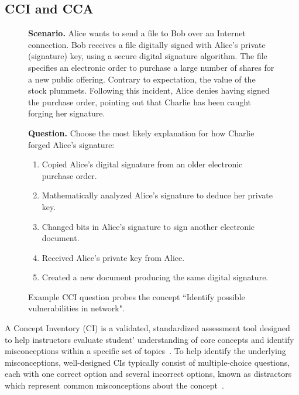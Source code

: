 \documentclass{uofithesis}
\begin{document}
\subsection{CCI and CCA}
\begin{figure} [H]
	\begin{mdframed}

		\small
		\raggedright
    \textbf{Scenario.}
      Alice wants to send a file to Bob over an Internet connection.
      Bob receives a file digitally signed with Alice’s private (signature) key, using a secure digital signature algorithm. The file specifies an electronic order to purchase a large number of shares for a new public offering. 
      Contrary to expectation, the value of the stock plummets. Following this incident, Alice denies having signed the purchase order, pointing out that Charlie has been caught forging her signature.

    \textbf{Question.} Choose the most likely explanation for how Charlie forged Alice’s signature:

    \begin{enumerate}
			\def\labelenumi{\Alph{enumi}.}
			\item
			Copied Alice’s digital signature from an older electronic purchase order.
			\item
			Mathematically analyzed Alice’s signature to deduce her private key.
			\item
			Changed bits in Alice’s signature to sign another electronic document.
			\item
			Received Alice’s private key from Alice.
			\item
			Created a new document producing the same digital signature.
	\end{enumerate}

	\end{mdframed}
	\caption{Example CCI question probes the concept ``Identify possible vulnerabilities in network".}

	\label{fig:example-question-intro}
\end{figure}
A Concept Inventory (CI) is a validated, standardized assessment tool designed to help instructors evaluate student' understanding of core concepts and identify misconceptions within a specific set of topics~\cite{CIMisconception}. To help identify the underlying misconceptions, well-designed CIs typically consist of multiple-choice questions, each with one correct option and several incorrect options, known as distractors which represent common misconceptions about the concept~\cite{CILib}.
\end{document}
